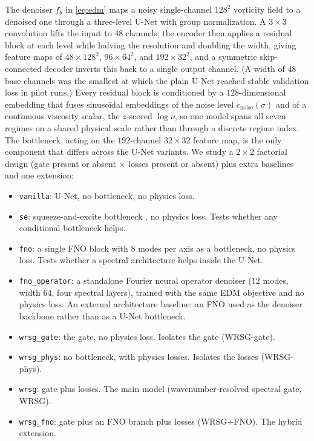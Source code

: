 \documentclass[10pt]{article} %
\begin{document}
The denoiser $f_\theta$ in \eqref{eq:edm} maps a noisy single-channel $128^2$ vorticity field to a denoised one through a three-level U-Net \citep{ronneberger2015unet} with group normalization. A $3\times3$ convolution lifts the input to $48$ channels; the encoder then applies a residual block at each level while halving the resolution and doubling the width, giving feature maps of $48{\times}128^2$, $96{\times}64^2$, and $192{\times}32^2$, and a symmetric skip-connected decoder inverts this back to a single output channel. (A width of $48$ base channels was the smallest at which the plain U-Net reached stable validation loss in pilot runs.) Every residual block is conditioned by a $128$-dimensional embedding that fuses sinusoidal embeddings of the noise level $c_{\text{noise}}(\sigma)$ and of a continuous viscosity scalar, the $z$-scored $\log \nu$, so one model spans all seven regimes on a shared physical scale rather than through a discrete regime index. The bottleneck, acting on the $192$-channel $32 \times 32$ feature map, is the only component that differs across the U-Net variants. We study a $2\times 2$ factorial design (gate present or absent $\times$ losses present or absent) plus extra baselines and one extension:
\begin{itemize}
\item \texttt{vanilla}: U-Net, no bottleneck, no physics loss.
\item \texttt{se}: squeeze-and-excite bottleneck \citep{hu2018squeeze}, no physics loss. Tests whether any conditional bottleneck helps.
\item \texttt{fno}: a single FNO block \citep{li2021fno} with $8$ modes per axis as a bottleneck, no physics loss. Tests whether a spectral architecture helps inside the U-Net.
\item \texttt{fno\_operator}: a standalone Fourier neural operator denoiser ($12$ modes, width $64$, four spectral layers), trained with the same EDM objective and no physics loss. An external architecture baseline: an FNO used as the denoiser backbone rather than as a U-Net bottleneck.
\item \texttt{wrsg\_gate}: the gate, no physics loss. Isolates the gate (WRSG-gate).
\item \texttt{wrsg\_phys}: no bottleneck, with physics losses. Isolates the losses (WRSG-phys).
\item \texttt{wrsg}: gate plus losses. The main model (wavenumber-resolved spectral gate, WRSG).
\item \texttt{wrsg\_fno}: gate plus an FNO branch plus losses (WRSG+FNO). The hybrid extension.
\end{itemize}
\end{document}
